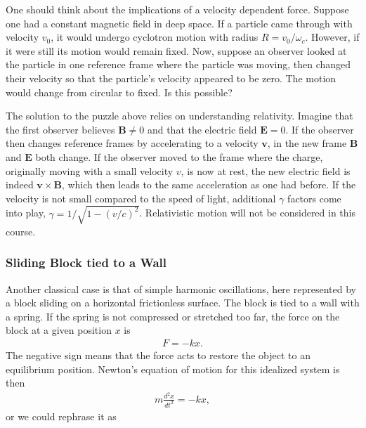\documentclass[letterpaper,10pt,english]{sphinxmanual}
\begin{document}
One should think about the implications of a velocity dependent
force. Suppose one had a constant magnetic field in deep space. If a
particle came through with velocity \(v_0\), it would undergo cyclotron
motion with radius \(R=v_0/\omega_c\). However, if it were still its
motion would remain fixed. Now, suppose an observer looked at the
particle in one reference frame where the particle was moving, then
changed their velocity so that the particle’s velocity appeared to be
zero. The motion would change from circular to fixed. Is this
possible?

The solution to the puzzle above relies on understanding
relativity. Imagine that the first observer believes \(\boldsymbol{B}\ne 0\) and
that the electric field \(\boldsymbol{E}=0\). If the observer then changes
reference frames by accelerating to a velocity \(\boldsymbol{v}\), in the new
frame \(\boldsymbol{B}\) and \(\boldsymbol{E}\) both change. If the observer moved to the
frame where the charge, originally moving with a small velocity \(v\),
is now at rest, the new electric field is indeed \(\boldsymbol{v}\times\boldsymbol{B}\),
which then leads to the same acceleration as one had before. If the
velocity is not small compared to the speed of light, additional
\(\gamma\) factors come into play,
\(\gamma=1/\sqrt{1-(v/c)^2}\). Relativistic motion will not be
considered in this course.


\subsubsection{Sliding Block tied to a Wall}
\label{\detokenize{chapter3:sliding-block-tied-to-a-wall}}
Another classical case is that of simple harmonic oscillations, here represented by a block sliding on a horizontal frictionless surface. The block is tied to a wall with a spring. If the spring is not compressed or stretched too far, the force on the block at a given position \(x\) is
\begin{equation*}
\begin{split}
F=-kx.
\end{split}
\end{equation*}
The negative sign means that the force acts to restore the object to an equilibrium position. Newton’s equation of motion for this idealized system is then
\begin{equation*}
\begin{split}
m\frac{d^2x}{dt^2}=-kx,
\end{split}
\end{equation*}
or we could rephrase it as
\end{document}
